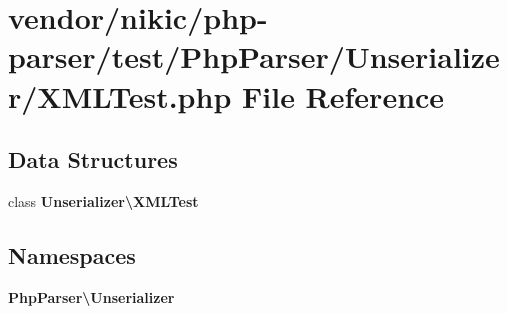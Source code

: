 \section{vendor/nikic/php-\/parser/test/\+Php\+Parser/\+Unserializer/\+X\+M\+L\+Test.php File Reference}
\label{nikic_2php-parser_2test_2_php_parser_2_unserializer_2_x_m_l_test_8php}
\subsection*{Data Structures}
\begin{DoxyCompactItemize}
\item 
class {\bf Unserializer\textbackslash{}\+X\+M\+L\+Test}
\end{DoxyCompactItemize}
\subsection*{Namespaces}
\begin{DoxyCompactItemize}
\item 
 {\bf Php\+Parser\textbackslash{}\+Unserializer}
\end{DoxyCompactItemize}
